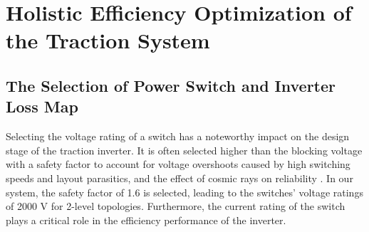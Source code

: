 \documentclass[conference]{IPEC2026}
\begin{document}



\section{Holistic Efficiency Optimization of the Traction System}

\subsection{The Selection of Power Switch and Inverter Loss Map}
Selecting the voltage rating of a switch has a noteworthy impact on the design stage of the traction inverter. 
It is often selected higher than the blocking voltage with a safety factor to account for voltage overshoots caused by high switching speeds and layout parasitics, and the effect of cosmic rays on reliability \cite{layout2}.
In our system, the safety factor of 1.6 is selected, leading to the switches' voltage ratings of 2000 V for 2-level topologies. 
Furthermore, the current rating of the switch plays a critical role in the efficiency performance of the inverter. 
\end{document}

